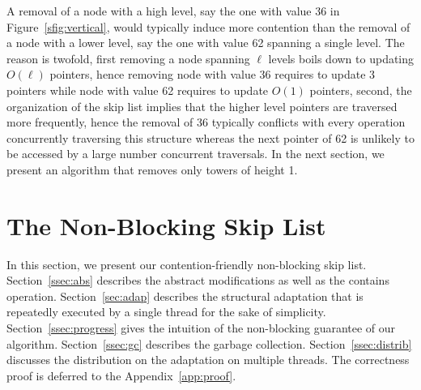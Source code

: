 A removal of a node with a high level, say the one with value 36 in 
Figure~\ref{sfig:vertical}, would typically induce more contention than the removal of a node with a lower 
level, say the one with value 62 spanning a single level.
The reason is twofold, first removing a node spanning $\ell$ levels boils down to updating $O(\ell)$ 
pointers, hence removing node with value 36 requires to update 3 pointers while node with value 62 
requires to update $O(1)$ pointers, second, the organization of the skip list implies that the higher level 
pointers are traversed more frequently, hence the removal of 36 
typically conflicts with every operation concurrently traversing this structure whereas the next pointer of 62 is unlikely to be accessed by
a large number concurrent traversals.
In the next section, we present an algorithm that removes only towers of height 1.



\section{The Non-Blocking Skip List}\label{sec:datastruct} 

In this section, we present our contention-friendly non-blocking skip list.
Section~\ref{ssec:abs} describes the abstract modifications as well as the contains operation.
Section~\ref{sec:adap} describes the structural adaptation that is repeatedly executed by a 
single thread for the sake of simplicity. 
Section~\ref{ssec:progress} gives the intuition of the non-blocking guarantee of our algorithm.
Section~\ref{ssec:gc} describes the garbage collection.
Section~\ref{ssec:distrib} discusses the 
distribution on the adaptation on multiple threads.
The correctness proof is deferred to the Appendix~\ref{app:proof}.




